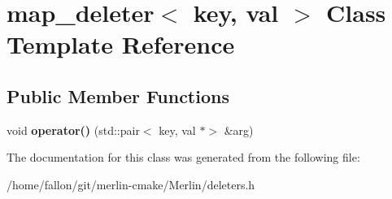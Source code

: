 \hypertarget{classmap__deleter}{}\section{map\+\_\+deleter$<$ key, val $>$ Class Template Reference}
\label{classmap__deleter}
\subsection*{Public Member Functions}
\begin{DoxyCompactItemize}
\item 
\mbox{\label{classmap__deleter_a94e44e43c4a99abdb90c044a7dfec51a}} 
void {\bfseries operator()} (std\+::pair$<$ key, val $\ast$$>$ \&arg)
\end{DoxyCompactItemize}


The documentation for this class was generated from the following file\+:\begin{DoxyCompactItemize}
\item 
/home/fallon/git/merlin-\/cmake/\+Merlin/deleters.\+h\end{DoxyCompactItemize}
